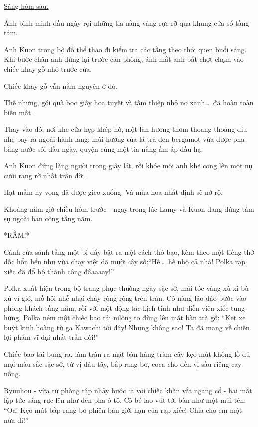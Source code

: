 \documentclass[../main.tex]{subfiles}
\begin{document}
\begin{center}
    \uline{Sáng hôm sau.}
\end{center}

Ánh bình minh đầu ngày rọi những tia nắng vàng rực rỡ qua khung cửa sổ tầng tám.

Anh Kuon trong bộ đồ thể thao đi kiểm tra các tầng theo thói quen buổi sáng. Khi bước chân anh dừng lại trước căn phòng, ánh mắt anh bất chợt chạm vào chiếc khay gỗ nhỏ trước cửa.

Chiếc khay gỗ vẫn nằm nguyên ở đó.

Thế nhưng, gói quà bọc giấy hoa tuyết và tấm thiệp nhỏ nơ xanh\dots\ đã hoàn toàn biến mất.

Thay vào đó, nơi khe cửa hẹp khép hờ, một làn hương thơm thoang thoảng dịu nhẹ bay ra ngoài hành lang: mùi hương của lá trà đen bergamot vừa được pha bằng nước sôi đầu ngày, quyện cùng một tia nắng ấm áp đầu hạ.

Anh Kuon đứng lặng người trong giây lát, rồi khóe môi anh khẽ cong lên một nụ cười rạng rỡ nhất trần đời.

Hạt mầm hy vọng đã được gieo xuống. Và mùa hoa nhất định sẽ nở rộ.

\omk

\pov{-}

Khoảng năm giờ chiều hôm trước - ngay trong lúc Lamy và Kuon đang đứng tâm sự ngoài ban công tầng năm.

*RẦM!*

Cánh cửa sảnh tầng một bị đẩy bật ra một cách thô bạo, kèm theo một tiếng thở dốc hổn hển như vừa chạy việt dã mười cây số:``Hế\dots\ hế nhô cả nhà! Polka rạp xiếc đã đổ bộ thành công đâaaaay!''

Polka xuất hiện trong bộ trang phục thường ngày sặc sỡ, mái tóc vàng xù xì bù xù vì gió, mồ hôi nhễ nhại chảy ròng ròng trên trán. Cô nàng lảo đảo bước vào phòng khách tầng năm, rồi với một động tác kịch tính như diễn viên xiếc tung hứng, Polka ném một chiếc bao tải nilông to đùng lên mặt bàn trà gỗ: ``Kẹt xe buýt kinh hoàng từ ga Kawachi tới đây! Nhưng không sao! Ta đã mang về chiến lợi phẩm vĩ đại nhất trần đời!''

Chiếc bao tải bung ra, làm tràn ra mặt bàn hàng trăm cây kẹo mút khổng lồ đủ mọi màu sắc sặc sỡ, từ vị dâu tây, bắp rang bơ, coca cho đến vị sầu riêng cay nồng.

Ryuuhou - vừa từ phòng tập nhảy bước ra với chiếc khăn vắt ngang cổ - hai mắt lập tức sáng rực lên như đèn pha ô tô. Cô bé lao vút tới bàn như một mũi tên: ``Oa! Kẹo mút bắp rang bơ phiên bản giới hạn của rạp xiếc! Chia cho em một nửa đi!''
\end{document}
